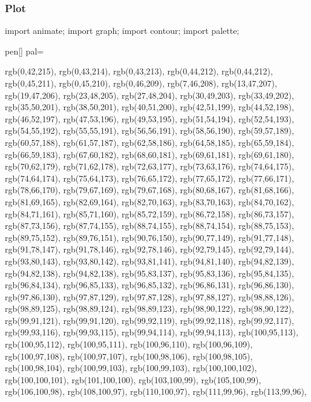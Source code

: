 \documentclass[12pt]{beamer}
\begin{document}
\begin{frame}[fragile]
\frametitle{Plot}

\begin{minipage}[t][6cm]{\textwidth}
	\begin{asy}
	import animate;
	import graph;
	import contour;
	import palette;
	
	pen[] pal={

rgb(0,42,215),
rgb(0,43,214),
rgb(0,43,213),
rgb(0,44,212),
rgb(0,44,212),
rgb(0,45,211),
rgb(0,45,210),
rgb(0,46,209),
rgb(7,46,208),
rgb(13,47,207),
rgb(19,47,206),
rgb(23,48,205),
rgb(27,48,204),
rgb(30,49,203),
rgb(33,49,202),
rgb(35,50,201),
rgb(38,50,201),
rgb(40,51,200),
rgb(42,51,199),
rgb(44,52,198),
rgb(46,52,197),
rgb(47,53,196),
rgb(49,53,195),
rgb(51,54,194),
rgb(52,54,193),
rgb(54,55,192),
rgb(55,55,191),
rgb(56,56,191),
rgb(58,56,190),
rgb(59,57,189),
rgb(60,57,188),
rgb(61,57,187),
rgb(62,58,186),
rgb(64,58,185),
rgb(65,59,184),
rgb(66,59,183),
rgb(67,60,182),
rgb(68,60,181),
rgb(69,61,181),
rgb(69,61,180),
rgb(70,62,179),
rgb(71,62,178),
rgb(72,63,177),
rgb(73,63,176),
rgb(74,64,175),
rgb(74,64,174),
rgb(75,64,173),
rgb(76,65,172),
rgb(77,65,172),
rgb(77,66,171),
rgb(78,66,170),
rgb(79,67,169),
rgb(79,67,168),
rgb(80,68,167),
rgb(81,68,166),
rgb(81,69,165),
rgb(82,69,164),
rgb(82,70,163),
rgb(83,70,163),
rgb(84,70,162),
rgb(84,71,161),
rgb(85,71,160),
rgb(85,72,159),
rgb(86,72,158),
rgb(86,73,157),
rgb(87,73,156),
rgb(87,74,155),
rgb(88,74,155),
rgb(88,74,154),
rgb(88,75,153),
rgb(89,75,152),
rgb(89,76,151),
rgb(90,76,150),
rgb(90,77,149),
rgb(91,77,148),
rgb(91,78,147),
rgb(91,78,146),
rgb(92,78,146),
rgb(92,79,145),
rgb(92,79,144),
rgb(93,80,143),
rgb(93,80,142),
rgb(93,81,141),
rgb(94,81,140),
rgb(94,82,139),
rgb(94,82,138),
rgb(94,82,138),
rgb(95,83,137),
rgb(95,83,136),
rgb(95,84,135),
rgb(96,84,134),
rgb(96,85,133),
rgb(96,85,132),
rgb(96,86,131),
rgb(96,86,130),
rgb(97,86,130),
rgb(97,87,129),
rgb(97,87,128),
rgb(97,88,127),
rgb(98,88,126),
rgb(98,89,125),
rgb(98,89,124),
rgb(98,89,123),
rgb(98,90,122),
rgb(98,90,122),
rgb(99,91,121),
rgb(99,91,120),
rgb(99,92,119),
rgb(99,92,118),
rgb(99,92,117),
rgb(99,93,116),
rgb(99,93,115),
rgb(99,94,114),
rgb(99,94,113),
rgb(100,95,113),
rgb(100,95,112),
rgb(100,95,111),
rgb(100,96,110),
rgb(100,96,109),
rgb(100,97,108),
rgb(100,97,107),
rgb(100,98,106),
rgb(100,98,105),
rgb(100,98,104),
rgb(100,99,103),
rgb(100,99,103),
rgb(100,100,102),
rgb(100,100,101),
rgb(101,100,100),
rgb(103,100,99),
rgb(105,100,99),
rgb(106,100,98),
rgb(108,100,97),
rgb(110,100,97),
rgb(111,99,96),
rgb(113,99,96),
}
\end{asy}
\end{minipage}
\end{frame}
\end{document}
